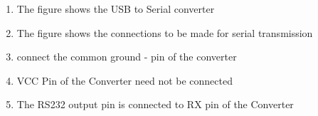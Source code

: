 \documentclass[table,10pt,red]{beamer}	%
\begin{document}
\begin{frame}
\begin{minipage}[c]{0.2\textwidth}
			\end{minipage}
		\pause
		\hfill
			\begin{minipage}[c]{0.75\textwidth}
				\begin{enumerate}
					\item The figure shows the USB to Serial converter
					\item The figure shows the connections to be made for serial transmission
					\item connect the common ground - pin of the converter
					\item VCC Pin of the Converter need not be connected
					\item The RS232 output pin is connected to RX pin of the Converter
				
					
				\end{enumerate}
			\end{minipage}   

\end{frame}
\end{document}
